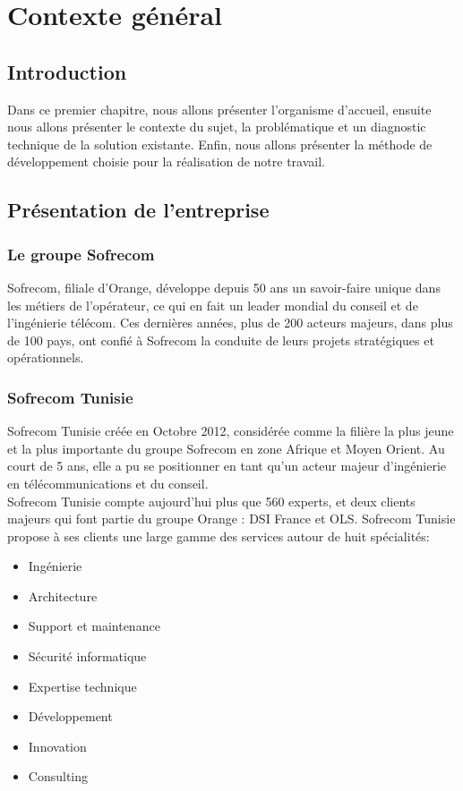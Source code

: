 \chapter{Contexte général}
\section*{Introduction}
Dans ce premier chapitre, nous allons présenter l’organisme d’accueil, ensuite nous allons présenter le contexte du sujet, la problématique et un diagnostic technique de la solution existante. Enfin, nous allons présenter la méthode de développement choisie pour la réalisation de notre travail.

\section[Présentation de l’entreprise]{Présentation de l’entreprise}

\subsection[Le groupe Sofrecom]{Le groupe Sofrecom \cite{sofrecom}}
Sofrecom, filiale d’Orange, développe depuis 50 ans un savoir-faire unique dans les métiers de l’opérateur, ce qui en fait un leader mondial du conseil et de l’ingénierie télécom. Ces dernières années, plus de 200 acteurs majeurs, dans plus de 100 pays, ont confié à Sofrecom la conduite de leurs projets stratégiques et opérationnels. 
\subsection{Sofrecom Tunisie \cite{sofrecomTun}}
Sofrecom Tunisie créée en Octobre 2012, considérée comme la filière la plus jeune et la plus importante du groupe Sofrecom en zone Afrique et Moyen Orient. Au court de 5 ans, elle a pu se positionner en tant qu’un acteur majeur  d’ingénierie en télécommunications et du conseil.\\
Sofrecom Tunisie compte aujourd’hui plus que 560 experts, et deux clients majeurs qui font partie du groupe Orange : DSI France et OLS. Sofrecom Tunisie propose à ses clients une large  gamme des services autour de huit spécialités:
\begin{itemize}
	\item Ingénierie
	\item Architecture
	\item Support et maintenance
	\item Sécurité informatique
	\item Expertise technique
	\item Développement
	\item Innovation 
	\item Consulting
\end{itemize}

